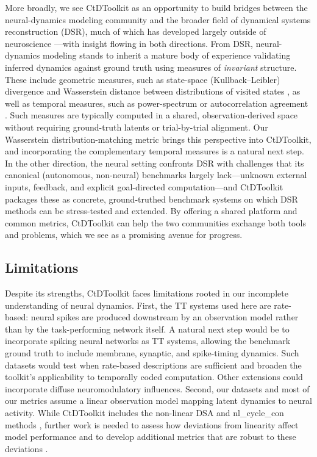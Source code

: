 \documentclass{article}
\begin{document}
More broadly, we see CtDToolkit as an opportunity to build bridges between the neural-dynamics modeling community and the broader field of dynamical systems reconstruction (DSR), much of which has developed largely outside of neuroscience \cite{durstewitz2023reconstructing, pmlr-v162-brenner22a, mikhaeil2022difficulty, patel2023using}---with insight flowing in both directions. From DSR, neural-dynamics modeling stands to inherit a mature body of experience validating inferred dynamics against ground truth using measures of \textit{invariant} structure. These include geometric measures, such as state-space (Kullback--Leibler) divergence \cite{Koppe2019PLRNN, pmlr-v162-brenner22a} and Wasserstein distance between distributions of visited states \cite{patel2023using}, as well as temporal measures, such as power-spectrum or autocorrelation agreement \cite{pmlr-v162-brenner22a, mikhaeil2022difficulty}. Such measures are typically computed in a shared, observation-derived space without requiring ground-truth latents or trial-by-trial alignment. Our Wasserstein distribution-matching metric brings this perspective into CtDToolkit, and incorporating the complementary temporal measures is a natural next step. In the other direction, the neural setting confronts DSR with challenges that its canonical (autonomous, non-neural) benchmarks largely lack---unknown external inputs, feedback, and explicit goal-directed computation---and CtDToolkit packages these as concrete, ground-truthed benchmark systems on which DSR methods can be stress-tested and extended. By offering a shared platform and common metrics, CtDToolkit can help the two communities exchange both tools and problems, which we see as a promising avenue for progress.

\subsection{Limitations}
\vspace{-0.2cm}

Despite its strengths, CtDToolkit faces limitations rooted in our incomplete understanding of neural dynamics. First, the TT systems used here are rate-based: neural spikes are produced downstream by an observation model rather than by the task-performing network itself. A natural next step would be to incorporate spiking neural networks as TT systems, allowing the benchmark ground truth to include membrane, synaptic, and spike-timing dynamics. Such datasets would test when rate-based descriptions are sufficient and broaden the toolkit's applicability to temporally coded computation. Other extensions could incorporate diffuse neuromodulatory influences. Second, our datasets and most of our metrics assume a linear observation model mapping latent dynamics to neural activity. While CtDToolkit includes the non-linear DSA and nl\_cycle\_con methods \cite{ostrow_dsa, versteeg2023expressive}, further work is needed to assess how deviations from linearity affect model performance and to develop additional metrics that are robust to these deviations \cite{gallego2017neural, jazayeri_interpreting_2021}.
\end{document}
